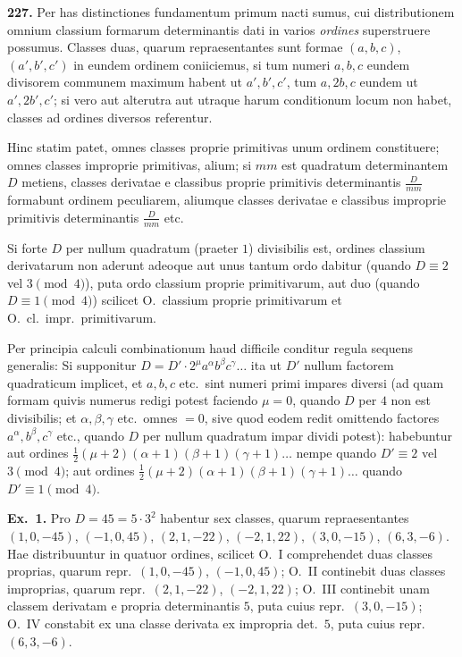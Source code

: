 \documentclass[12pt,a4paper]{article}
\theoremstyle{plain}
\theoremstyle{definition}
\theoremstyle{remark}
\begin{document}
\textbf{227.}
Per has distinctiones fundamentum primum nacti sumus, cui distributionem omnium classium formarum determinantis dati in varios \emph{ordines} superstruere possumus. Classes duas, quarum repraesentantes sunt formae $(a,b,c)$, $(a',b',c')$ in eundem ordinem coniiciemus, si tum numeri $a,b,c$ eundem divisorem communem maximum habent ut $a',b',c'$, tum $a,2b,c$ eundem ut $a',2b',c'$; si vero aut alterutra aut utraque harum conditionum locum non habet, classes ad ordines diversos referentur.

Hinc statim patet, omnes classes proprie primitivas unum ordinem constituere; omnes classes improprie primitivas, alium; si $mm$ est quadratum determinantem $D$ metiens, classes derivatae e classibus proprie primitivis determinantis $\frac{D}{mm}$ formabunt ordinem peculiarem, aliumque classes derivatae e classibus improprie primitivis determinantis $\frac{D}{mm}$ etc.

Si forte $D$ per nullum quadratum (praeter $1$) divisibilis est, ordines classium derivatarum non aderunt adeoque aut unus tantum ordo dabitur (quando $D\equiv2$ vel $3\pmod4$), puta ordo classium proprie primitivarum, aut duo (quando $D\equiv1\pmod4$) scilicet O.\ classium proprie primitivarum et O.\ cl.\ impr.\ primitivarum.

Per principia calculi combinationum haud difficile conditur regula sequens generalis: Si supponitur $D=D'\cdot2^\mu a^\alpha b^\beta c^\gamma\ldots$ ita ut $D'$ nullum factorem quadraticum implicet, et $a,b,c$ etc.\ sint numeri primi impares diversi (ad quam formam quivis numerus redigi potest faciendo $\mu=0$, quando $D$ per $4$ non est divisibilis; et $\alpha,\beta,\gamma$ etc.\ omnes $=0$, sive quod eodem redit omittendo factores $a^\alpha,b^\beta,c^\gamma$ etc., quando $D$ per nullum quadratum impar dividi potest): habebuntur aut ordines $\frac{1}{2}(\mu+2)(\alpha+1)(\beta+1)(\gamma+1)\ldots$ nempe quando $D'\equiv2$ vel $3\pmod4$; aut ordines $\frac{1}{2}(\mu+2)(\alpha+1)(\beta+1)(\gamma+1)\ldots$ quando $D'\equiv1\pmod4$.

\textbf{Ex.~1.} Pro $D=45=5\cdot3^2$ habentur sex classes, quarum repraesentantes $(1,0,-45)$, $(-1,0,45)$, $(2,1,-22)$, $(-2,1,22)$, $(3,0,-15)$, $(6,3,-6)$. Hae distribuuntur in quatuor ordines, scilicet O.\ I comprehendet duas classes proprias, quarum repr.\ $(1,0,-45)$, $(-1,0,45)$; O.\ II continebit duas classes improprias, quarum repr.\ $(2,1,-22)$, $(-2,1,22)$; O.\ III continebit unam classem derivatam e propria determinantis $5$, puta cuius repr.\ $(3,0,-15)$; O.\ IV constabit ex una classe derivata ex impropria det.\ $5$, puta cuius repr.\ $(6,3,-6)$.
\end{document}
